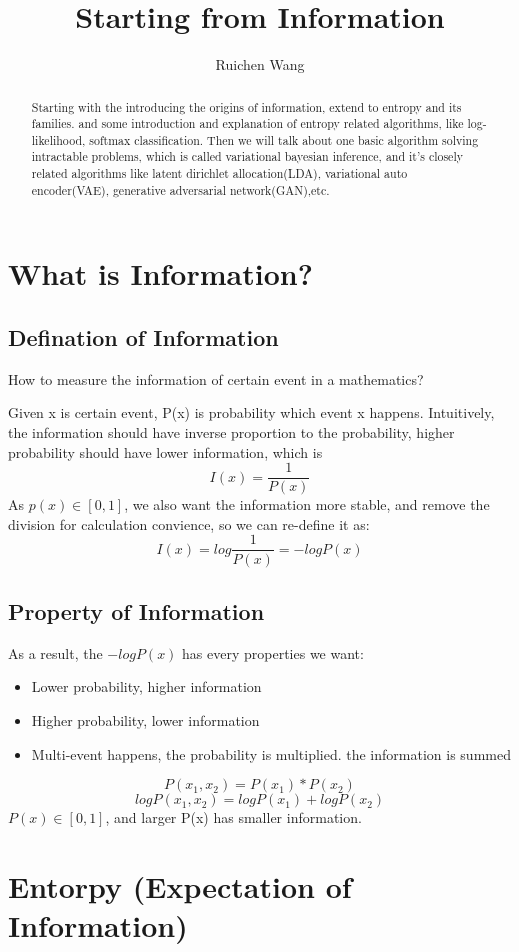 \documentclass{article}
\author{Ruichen Wang}
\title{Starting from Information}
\begin{document}
\maketitle
\begin{abstract}
Starting with the introducing the origins of information, extend to entropy and its families. and some introduction and explanation of entropy related algorithms, like log-likelihood, softmax classification. Then we will talk about one basic algorithm solving intractable problems, which is called variational bayesian inference, and it's  closely related algorithms like latent dirichlet allocation(LDA), variational auto encoder(VAE), generative adversarial network(GAN),etc.
\end{abstract}

\tableofcontents
\section{What is Information?} 
\subsection{Defination of Information}
How to measure the information of certain event in a mathematics?

Given x is certain event, P(x) is probability which event x happens. Intuitively, the information should have inverse proportion to the probability, higher probability should have lower information, which is 
$$I(x)=\frac{1}{P(x)}$$
As $p(x) \in [0,1] $, we also want the information more stable, and remove the division for calculation convience, so we can re-define it as:
$$I(x)=log\frac{1}{P(x)}=-logP(x)$$
\subsection{Property of Information}
As a result, the $-logP(x)$ has every properties we want:
\begin{itemize}
\item Lower probability, higher information
\item Higher probability, lower information
\item Multi-event happens, the probability is multiplied. the information is summed
\end{itemize}
$$P(x_{1},x_{2})=P(x_{1})*P(x_{2})$$
$$logP(x_{1},x_{2})=logP(x_{1})+logP(x_{2})$$
$P(x) \in [0,1]$, and larger P(x) has smaller information.
\section{Entorpy (Expectation of Information)}
\end{document}
